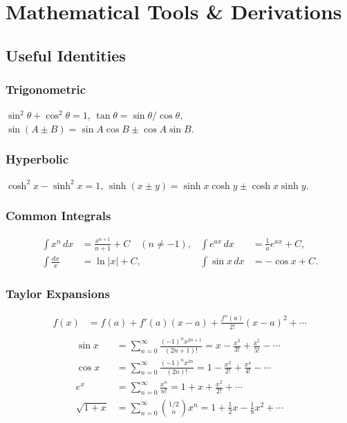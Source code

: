 \chapter{Mathematical Tools \& Derivations}

\section{Useful Identities}

\subsection*{Trigonometric}
$\sin^2\theta + \cos^2\theta = 1$,\quad
$\tan\theta = \sin\theta/\cos\theta$,\quad
$\sin(A\pm B) = \sin A\cos B \pm \cos A\sin B$.

\subsection*{Hyperbolic}
$\cosh^2 x - \sinh^2 x = 1$,\quad
$\sinh(x\pm y) = \sinh x\cosh y \pm \cosh x\sinh y$.

\subsection*{Common Integrals}
\begin{align*}
  \int x^n\,dx &= \tfrac{x^{n+1}}{n+1} + C \quad (n\neq-1), &
  \int e^{ax}\,dx &= \tfrac{1}{a}e^{ax}+C,\\
  \int \frac{dx}{x} &= \ln|x|+C, &
  \int \sin x\,dx &= -\cos x + C.
\end{align*}

\subsection*{Taylor Expansions}
\begin{align*}
      f(x) &= f(a) + f'(a)(x-a) + \tfrac{f''(a)}{2!}(x-a)^2 + \cdots\\
\end{align*}
\begin{align*}
      \sin x &= \sum_{n=0}^\infty \frac{(-1)^n x^{2n+1}}{(2n+1)!} = x - \tfrac{x^3}{3!} + \tfrac{x^5}{5!} - \cdots\\
      \cos x &= \sum_{n=0}^\infty \frac{(-1)^n x^{2n}}{(2n)!} = 1 - \tfrac{x^2}{2!} + \tfrac{x^4}{4!} - \cdots \\
      e^x &= \sum_{n=0}^\infty \frac{x^n}{n!} = 1 + x + \tfrac{x^2}{2!} + \cdots \\
      \sqrt{1+x} &= \sum_{n=0}^\infty \binom{1/2}{n} x^n = 1 + \tfrac{1}{2}x - \tfrac{1}{8}x^2 + \cdots
\end{align*}

